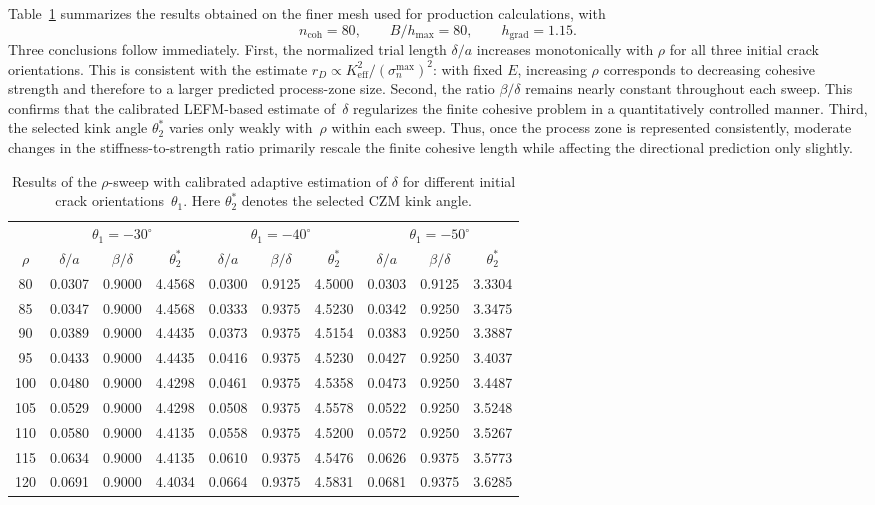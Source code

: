 \documentclass[smallextended]{svjour3}       %
\begin{document}
Table~\ref{tab:rho_sweep_all} summarizes the results obtained on the finer mesh
used for production calculations, with
\[
n_{\mathrm{coh}}=80,\qquad B/h_{\max}=80,\qquad h_{\mathrm{grad}}=1.15.
\]
Three conclusions follow immediately. First, the normalized trial length
$\delta/a$ increases monotonically with $\rho$ for all three initial crack
orientations. This is consistent with the estimate
$r_D\propto K_{\mathrm{eff}}^2/(\sigma_n^{\max})^2$: with fixed $E$,
increasing $\rho$ corresponds to decreasing cohesive strength and therefore to
a larger predicted process-zone size. Second, the ratio $\beta/\delta$ remains
nearly constant throughout each sweep. This confirms that the calibrated
LEFM-based estimate of~$\delta$ regularizes the finite cohesive problem in a
quantitatively controlled manner. Third, the selected kink angle
$\theta_2^\ast$ varies only weakly with~$\rho$ within each sweep. Thus, once
the process zone is represented consistently, moderate changes in the
stiffness-to-strength ratio primarily rescale the finite cohesive length while
affecting the directional prediction only slightly.

\begin{table}[t]
	\centering
	\small
	\setlength{\tabcolsep}{4pt}
	\caption{Results of the $\rho$-sweep with calibrated adaptive estimation of $\delta$
		for different initial crack orientations~$\theta_1$. Here $\theta_2^\ast$
		denotes the selected CZM kink angle.}
	\label{tab:rho_sweep_all}
	\begin{tabular}{c ccc ccc ccc}
		\toprule
		& \multicolumn{3}{c}{$\theta_1=-30^\circ$}
		& \multicolumn{3}{c}{$\theta_1=-40^\circ$}
		& \multicolumn{3}{c}{$\theta_1=-50^\circ$} \\
		\cmidrule(lr){2-4}\cmidrule(lr){5-7}\cmidrule(lr){8-10}
		$\rho$
		& $\delta/a$ & $\beta/\delta$ & $\theta_2^\ast$
		& $\delta/a$ & $\beta/\delta$ & $\theta_2^\ast$
		& $\delta/a$ & $\beta/\delta$ & $\theta_2^\ast$ \\
		\midrule
		80  & 0.0307 & 0.9000 & 4.4568 & 0.0300 & 0.9125 & 4.5000 & 0.0303 & 0.9125 & 3.3304 \\
		85  & 0.0347 & 0.9000 & 4.4568 & 0.0333 & 0.9375 & 4.5230 & 0.0342 & 0.9250 & 3.3475 \\
		90  & 0.0389 & 0.9000 & 4.4435 & 0.0373 & 0.9375 & 4.5154 & 0.0383 & 0.9250 & 3.3887 \\
		95  & 0.0433 & 0.9000 & 4.4435 & 0.0416 & 0.9375 & 4.5230 & 0.0427 & 0.9250 & 3.4037 \\
		100 & 0.0480 & 0.9000 & 4.4298 & 0.0461 & 0.9375 & 4.5358 & 0.0473 & 0.9250 & 3.4487 \\
		105 & 0.0529 & 0.9000 & 4.4298 & 0.0508 & 0.9375 & 4.5578 & 0.0522 & 0.9250 & 3.5248 \\
		110 & 0.0580 & 0.9000 & 4.4135 & 0.0558 & 0.9375 & 4.5200 & 0.0572 & 0.9250 & 3.5267 \\
		115 & 0.0634 & 0.9000 & 4.4135 & 0.0610 & 0.9375 & 4.5476 & 0.0626 & 0.9375 & 3.5773 \\
		120 & 0.0691 & 0.9000 & 4.4034 & 0.0664 & 0.9375 & 4.5831 & 0.0681 & 0.9375 & 3.6285 \\
		\bottomrule
	\end{tabular}
\end{table}
\end{document}
